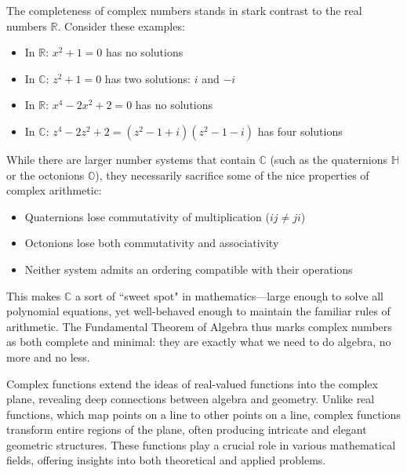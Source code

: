 \noindent The completeness of complex numbers stands in stark contrast to the real numbers $\mathbb{R}$. Consider these examples:
\begin{itemize}
   \item In $\mathbb{R}$: $x^2 + 1 = 0$ has no solutions
   \item In $\mathbb{C}$: $z^2 + 1 = 0$ has two solutions: $i$ and $-i$
   \item In $\mathbb{R}$: $x^4 - 2x^2 + 2 = 0$ has no solutions
   \item In $\mathbb{C}$: $z^4 - 2z^2 + 2 = (z^2-1+i)(z^2-1-i)$ has four solutions
\end{itemize}

\noindent While there are larger number systems that contain $\mathbb{C}$ (such as the quaternions $\mathbb{H}$ or the octonions $\mathbb{O}$), they necessarily sacrifice some of the nice properties of complex arithmetic:
\begin{itemize}
   \item Quaternions lose commutativity of multiplication ($ij \neq ji$)
   \item Octonions lose both commutativity and associativity
   \item Neither system admits an ordering compatible with their operations
\end{itemize}

\noindent This makes $\mathbb{C}$ a sort of ``sweet spot" in mathematics—large enough to solve all polynomial equations, yet well-behaved enough to maintain the familiar rules of arithmetic. The Fundamental Theorem of Algebra thus marks complex numbers as both complete and minimal: they are exactly what we need to do algebra, no more and no less.

\newpage












 

\noindent Complex functions extend the ideas of real-valued functions into the complex plane, revealing deep connections between algebra and geometry. Unlike real functions, which map points on a line to other points on a line, complex functions transform entire regions of the plane, often producing intricate and elegant geometric structures. These functions play a crucial role in various mathematical fields, offering insights into both theoretical and applied problems.

